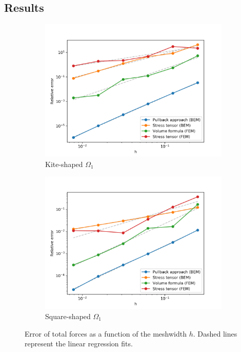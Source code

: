 \documentclass{article}
\theoremstyle{remark}
\begin{document}
\subsection{Results}
\begin{figure}[h!]
    \centering
    \begin{subfigure}{0.49\textwidth}
        \centering
        \includegraphics[width=\textwidth]{kite5_result.png}
        \caption{Kite-shaped $\Omega_1$}
    \end{subfigure}
    \begin{subfigure}{0.49\textwidth}
        \centering
        \includegraphics[width=\textwidth]{square5_result.png}
        \caption{Square-shaped $\Omega_1$}
    \end{subfigure}
    \caption{Error of total forces as a function of the meshwidth $h$. Dashed lines represent the linear regression fits.}
    \label{fig:res}
\end{figure}
\end{document}
